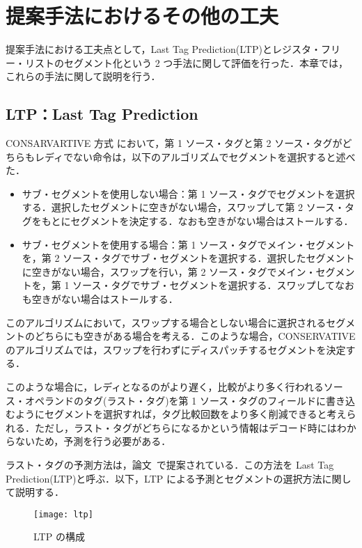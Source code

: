 \chapter{提案手法におけるその他の工夫}
\label{sec:switch}

提案手法における工夫点として，Last Tag Prediction(LTP)とレジスタ・フリー・リストのセグメント化という 2 つ手法に関して評価を行った．本章では，これらの手法に関して説明を行う．

\section{LTP：Last Tag Prediction}
CONSARVARTIVE 方式 において，第 1 ソース・タグと第 2 ソース・タグがどちらもレディでない命令は，以下のアルゴリズムでセグメントを選択すると述べた．

\begin{itemize}
  \item サブ・セグメントを使用しない場合：第 1 ソース・タグでセグメントを選択する．選択したセグメントに空きがない場合，スワップして第 2 ソース・タグをもとにセグメントを決定する．なおも空きがない場合はストールする．
  \item サブ・セグメントを使用する場合：第 1 ソース・タグでメイン・セグメントを，第 2 ソース・タグでサブ・セグメントを選択する．選択したセグメントに空きがない場合，スワップを行い，第 2 ソース・タグでメイン・セグメントを，第 1 ソース・タグでサブ・セグメントを選択する．スワップしてなおも空きがない場合はストールする．
\end{itemize}

このアルゴリズムにおいて，スワップする場合としない場合に選択されるセグメントのどちらにも空きがある場合を考える．このような場合，CONSERVATIVE のアルゴリズムでは，スワップを行わずにディスパッチするセグメントを決定する．

このような場合に，レディとなるのがより遅く，比較がより多く行われるソース・オペランドのタグ(ラスト・タグ)を第 1 ソース・タグのフィールドに書き込むようにセグメントを選択すれば，タグ比較回数をより多く削減できると考えられる．ただし，ラスト・タグがどちらになるかという情報はデコード時にはわからないため，予測を行う必要がある．

ラスト・タグの予測方法は，論文~\cite{ernst2002}で提案されている．この方法を Last Tag Prediction(LTP)と呼ぶ．以下，LTP による予測とセグメントの選択方法に関して説明する．

\begin{figure}[htb]
  \centering
  \texttt{[image: ltp]}
  \caption{LTP の構成}
  \label{fig:ltp}
\end{figure}

